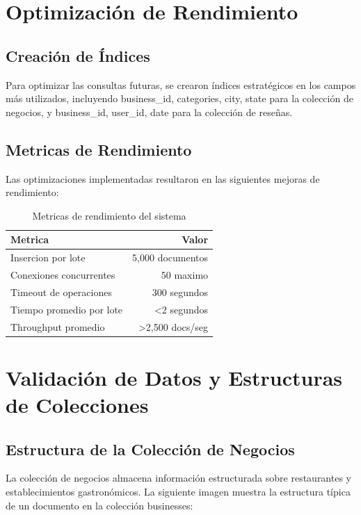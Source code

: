 \documentclass[12pt,a4paper,twoside,openany]{book}
\begin{document}
\section{Optimización de Rendimiento}

\subsection{Creación de Índices}

Para optimizar las consultas futuras, se crearon índices estratégicos en los campos más utilizados, incluyendo business\_id, categories, city, state para la colección de negocios, y business\_id, user\_id, date para la colección de reseñas.

\subsection{Metricas de Rendimiento}

Las optimizaciones implementadas resultaron en las siguientes mejoras de rendimiento:

\begin{table}[H]
\centering
\caption{Metricas de rendimiento del sistema}
\begin{tabular}{@{}lr@{}}
\toprule
\textbf{Metrica} & \textbf{Valor} \\
\midrule
Insercion por lote & 5,000 documentos \\
Conexiones concurrentes & 50 maximo \\
Timeout de operaciones & 300 segundos \\
Tiempo promedio por lote & <2 segundos \\
Throughput promedio & >2,500 docs/seg \\
\bottomrule
\end{tabular}
\end{table}

\section{Validación de Datos y Estructuras de Colecciones}

\subsection{Estructura de la Colección de Negocios}

La colección de negocios almacena información estructurada sobre restaurantes y establecimientos gastronómicos. La siguiente imagen muestra la estructura típica de un documento en la colección businesses:
\end{document}

